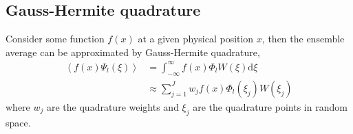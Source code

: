 \documentclass{article}
\newcommand{\dee}{\mathrm{d}}
\newcommand{\Ensemble}[1]{\left\langle #1 \right\rangle}
\begin{document}
\subsection*{Gauss-Hermite quadrature}

Consider some function $f(x)$ at a given physical position $x$, then the ensemble average can be approximated by Gauss-Hermite quadrature,
\begin{align}
	\Ensemble{f(x) \Psi_l(\xi)} &= \int_{- \infty}^\infty f(x) \Phi_l W(\xi) \dee \xi \\
	&\approx \sum_{j=1}^J w_j f(x) \Phi_l(\xi_j) W(\xi_j)
\end{align}
where $w_j$ are the quadrature weights and $\xi_j$ are the quadrature points in random space.



\end{document}
